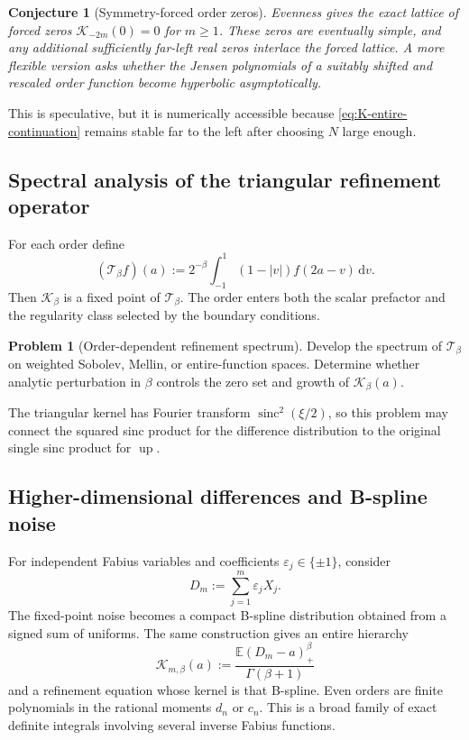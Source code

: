 \documentclass[11pt,oneside]{article}
\newtheorem{conjecture}[theorem]{Conjecture}
\theoremstyle{definition}
\newtheorem{problem}[theorem]{Problem}
\theoremstyle{remark}
\newcommand{\E}{\mathbb E}
\newcommand{\Up}{\operatorname{up}}
\newcommand{\sinc}{\operatorname{sinc}}
\newcommand{\dd}{\,\mathrm d}
\newcommand{\Kord}{\mathcal K}
\begin{document}
\begin{conjecture}[Symmetry-forced order zeros]
Evenness gives the exact lattice of forced zeros
$\Kord_{-2m}(0)=0$ for $m\ge1$.  These zeros are eventually simple, and any
additional sufficiently far-left real zeros interlace the forced lattice.
A more flexible version asks whether the Jensen polynomials of a suitably
shifted and rescaled order function become hyperbolic asymptotically.
\end{conjecture}

This is speculative, but it is numerically accessible because
\eqref{eq:K-entire-continuation} remains stable far to the left after choosing
$N$ large enough.

\subsection{Spectral analysis of the triangular refinement operator}

For each order define
\begin{equation}
 (\mathcal T_\beta f)(a)
 :=2^{-\beta}\int_{-1}^{1}(1-|v|)f(2a-v)\dd v.
\end{equation}
Then $\Kord_\beta$ is a fixed point of $\mathcal T_\beta$.  The order enters
both the scalar prefactor and the regularity class selected by the boundary
conditions.

\begin{problem}[Order-dependent refinement spectrum]
Develop the spectrum of $\mathcal T_\beta$ on weighted Sobolev, Mellin, or
entire-function spaces.  Determine whether analytic perturbation in $\beta$
controls the zero set and growth of $\Kord_\beta(a)$.
\end{problem}

The triangular kernel has Fourier transform
$\sinc^2(\xi/2)$, so this problem may connect the squared sinc product for the
difference distribution to the original single sinc product for $\Up$.

\subsection{Higher-dimensional differences and B-spline noise}

For independent Fabius variables and coefficients $\varepsilon_j\in\{\pm1\}$,
consider
\begin{equation}
 D_m:=\sum_{j=1}^{m}\varepsilon_jX_j.
\end{equation}
The fixed-point noise becomes a compact B-spline distribution obtained from a
signed sum of uniforms.  The same construction gives an entire hierarchy
\begin{equation}
 \Kord_{m,\beta}(a)
 :=\frac{\E(D_m-a)_+^\beta}{\Gamma(\beta+1)}
\end{equation}
and a refinement equation whose kernel is that B-spline.  Even orders are
finite polynomials in the rational moments $d_n$ or $c_n$.  This is a broad
family of exact definite integrals involving several inverse Fabius
functions.
\end{document}
